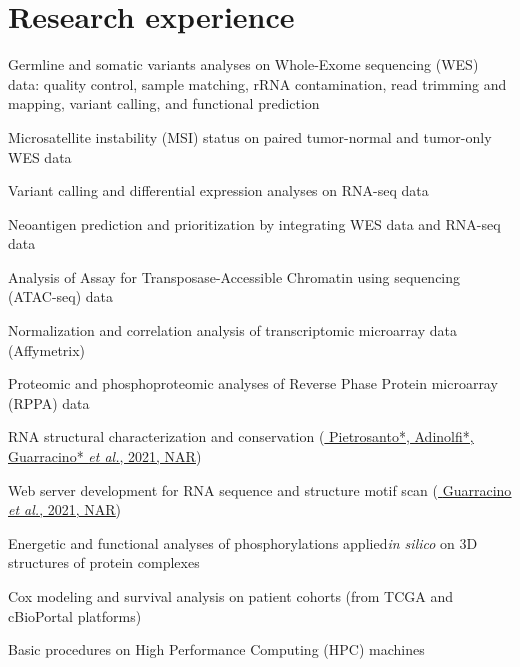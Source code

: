 \documentclass[11pt,a4paper,sans]{moderncv} %
\newcommand{\myul}[2][black]{\setulcolor{#1}\ul{#2}\setulcolor{black}}
\begin{document}
\section{Research experience}

\begin{itemize}
{
    \item Germline and somatic variants analyses on Whole-Exome sequencing (WES) data: quality control, sample matching, rRNA contamination, read trimming and mapping, variant calling, and functional prediction
    \item Microsatellite instability (MSI) status on paired tumor-normal and tumor-only WES data
    \item Variant calling and differential expression analyses on RNA-seq data
    \item Neoantigen prediction and prioritization by integrating WES data and RNA-seq data
    \item Analysis of Assay for Transposase-Accessible Chromatin using sequencing (ATAC-seq) data
    \item Normalization and correlation analysis of transcriptomic microarray data (Affymetrix)
    \item Proteomic and phosphoproteomic analyses of Reverse Phase Protein microarray (RPPA) data
    \item RNA structural characterization and conservation (\faBook \href{https://doi.org/10.1093/nargab/lqab007}{\color{teal} \myul[teal] { Pietrosanto*, Adinolfi*, Guarracino* \textit{et al.}, 2021, NAR}})
    \item Web server development for RNA sequence and structure motif scan (\faBook \href{https://doi.org/10.1093/nar/gkab400}{\color{teal} \myul[teal] { Guarracino \textit{et al.}, 2021, NAR}})
    \item Energetic and functional analyses of phosphorylations applied\textit{in silico} on 3D structures of protein complexes
    \item Cox modeling and survival analysis on patient cohorts (from TCGA and cBioPortal platforms)
    \item Basic procedures on High Performance Computing (HPC) machines
}
\end{itemize}
\end{document}
